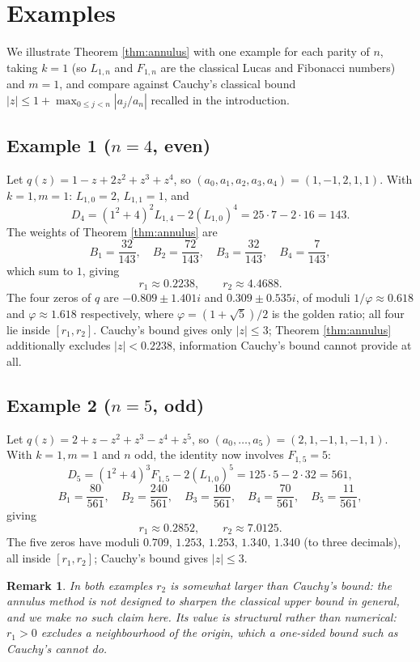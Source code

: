 \documentclass[11pt,a4paper]{article}
\newtheorem{remark}{Remark}[section]
\numberwithin{equation}{section}
\numberwithin{table}{section}
\numberwithin{figure}{section}
\begin{document}
\section{Examples}
\label{sec:examples}

We illustrate Theorem \ref{thm:annulus} with one example for each parity of $n$, taking $k=1$ (so $L_{1,n}$ and $F_{1,n}$ are the classical Lucas and Fibonacci numbers) and $m=1$, and compare against Cauchy's classical bound $|z|\le1+\max_{0\le j<n}|a_j/a_n|$ recalled in the introduction.

\subsection*{Example 1 ($n=4$, even)}

Let $q(z)=1-z+2z^2+z^3+z^4$, so $(a_0,a_1,a_2,a_3,a_4)=(1,-1,2,1,1)$. With $k=1,m=1$: $L_{1,0}=2$, $L_{1,1}=1$, and
\[
D_4=(1^2+4)^{2}L_{1,4}-2(L_{1,0})^4=25\cdot7-2\cdot16=143.
\]
The weights of Theorem \ref{thm:annulus} are
\[
B_1=\frac{32}{143},\quad B_2=\frac{72}{143},\quad B_3=\frac{32}{143},\quad B_4=\frac{7}{143},
\]
which sum to $1$, giving
\[
r_1\approx0.2238,\qquad r_2\approx4.4688.
\]
The four zeros of $q$ are $-0.809\pm1.401i$ and $0.309\pm0.535i$, of moduli $1/\varphi\approx0.618$ and $\varphi\approx1.618$ respectively, where $\varphi=(1+\sqrt5)/2$ is the golden ratio; all four lie inside $[r_1,r_2]$. Cauchy's bound gives only $|z|\le3$; Theorem \ref{thm:annulus} additionally excludes $|z|<0.2238$, information Cauchy's bound cannot provide at all.

\subsection*{Example 2 ($n=5$, odd)}

Let $q(z)=2+z-z^2+z^3-z^4+z^5$, so $(a_0,\dots,a_5)=(2,1,-1,1,-1,1)$. With $k=1,m=1$ and $n$ odd, the identity now involves $F_{1,5}=5$:
\[
D_5=(1^2+4)^{3}F_{1,5}-2(L_{1,0})^5=125\cdot5-2\cdot32=561,
\]
\[
B_1=\frac{80}{561},\quad B_2=\frac{240}{561},\quad B_3=\frac{160}{561},\quad B_4=\frac{70}{561},\quad B_5=\frac{11}{561},
\]
giving
\[
r_1\approx0.2852,\qquad r_2\approx7.0125.
\]
The five zeros have moduli $0.709,\,1.253,\,1.253,\,1.340,\,1.340$ (to three decimals), all inside $[r_1,r_2]$; Cauchy's bound gives $|z|\le3$.

\begin{remark}
	In both examples $r_2$ is somewhat larger than Cauchy's bound: the annulus method is not designed to sharpen the classical upper bound in general, and we make no such claim here. Its value is structural rather than numerical: $r_1>0$ excludes a neighbourhood of the origin, which a one-sided bound such as Cauchy's cannot do.
\end{remark}
\end{document}
